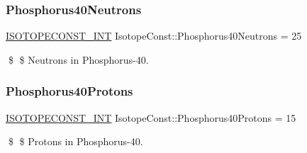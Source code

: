 \subsubsection{\texorpdfstring{Phosphorus40\+Neutrons}{Phosphorus40Neutrons}}
{\footnotesize\ttfamily \mbox{\hyperlink{group___isotope_const-_macros_ga5f18360b3e99483a35c32d789e62621c}{I\+S\+O\+T\+O\+P\+E\+C\+O\+N\+S\+T\+\_\+\+I\+NT}} Isotope\+Const\+::\+Phosphorus40\+Neutrons = 25}

\$ \$ Neutrons in Phosphorus-\/40. \mbox{\label{group___isotope_const-_phosphorus-_p40_ga1596e1441a9b470fc8d977a0373e6419}} 
\subsubsection{\texorpdfstring{Phosphorus40\+Protons}{Phosphorus40Protons}}
{\footnotesize\ttfamily \mbox{\hyperlink{group___isotope_const-_macros_ga5f18360b3e99483a35c32d789e62621c}{I\+S\+O\+T\+O\+P\+E\+C\+O\+N\+S\+T\+\_\+\+I\+NT}} Isotope\+Const\+::\+Phosphorus40\+Protons = 15}

\$ \$ Protons in Phosphorus-\/40. 